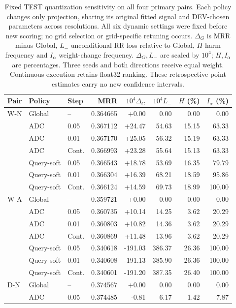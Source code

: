 \begin{table}[htbp]
\centering\footnotesize\setlength{\tabcolsep}{4pt}
\caption{Fixed TEST quantization sensitivity on all four primary pairs. Each policy changes only projection, sharing its original fitted signal and DEV-chosen parameters across resolutions. All six dynamic settings were fixed before new scoring; no grid selection or grid-specific retuning occurs. $\Delta_G$ is MRR minus Global, $L_-$ unconditional RR loss relative to Global, $H$ harm frequency and $I_\alpha$ weight-change frequency. $\Delta_G,L_-$ are scaled by $10^4$; $H,I_\alpha$ are percentages. Three seeds and both directions receive equal weight. Continuous execution retains float32 ranking. These retrospective point estimates carry no new confidence intervals.}
\label{tab:grid-test}
\begin{tabular}{lllrrrrr}
\toprule
Pair & Policy & Step & MRR & $10^4\Delta_G$ & $10^4L_-$ & $H$ (\%) & $I_\alpha$ (\%)\\
\midrule
W-N & Global & -- & 0.364665 & +0.00 & 0.00 & 0.00 & 0.00\\
 & ADC & 0.05 & 0.367112 & +24.47 & 54.63 & 15.15 & 63.33\\
 & ADC & 0.01 & 0.367170 & +25.05 & 56.32 & 15.19 & 63.33\\
 & ADC & Cont. & 0.366993 & +23.28 & 55.64 & 15.13 & 63.33\\
 & Query-soft & 0.05 & 0.366543 & +18.78 & 53.69 & 16.35 & 79.79\\
 & Query-soft & 0.01 & 0.366304 & +16.39 & 68.21 & 18.59 & 95.86\\
 & Query-soft & Cont. & 0.366124 & +14.59 & 69.73 & 18.99 & 100.00\\
\midrule
W-A & Global & -- & 0.359721 & +0.00 & 0.00 & 0.00 & 0.00\\
 & ADC & 0.05 & 0.360735 & +10.14 & 14.25 & 3.62 & 20.29\\
 & ADC & 0.01 & 0.360803 & +10.82 & 14.36 & 3.62 & 20.29\\
 & ADC & Cont. & 0.360869 & +11.48 & 13.96 & 3.62 & 20.29\\
 & Query-soft & 0.05 & 0.340618 & -191.03 & 386.37 & 26.36 & 100.00\\
 & Query-soft & 0.01 & 0.340608 & -191.13 & 385.90 & 26.36 & 100.00\\
 & Query-soft & Cont. & 0.340601 & -191.20 & 387.35 & 26.40 & 100.00\\
\midrule
D-N & Global & -- & 0.374567 & +0.00 & 0.00 & 0.00 & 0.00\\
 & ADC & 0.05 & 0.374485 & -0.81 & 6.17 & 1.42 & 7.87\\

\end{tabular}
\end{table}

